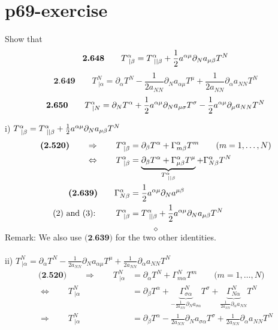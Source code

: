 \section{p69-exercise}
\begin{tcolorbox}
Show that
$$\textbf{2.648}\quad\quad T^{\alpha}_{\ |\beta} = T^{\alpha}_{\ ||\beta} + \frac{1}{2} a^{\alpha \mu} \partial_N a_{\mu\beta}T^N$$
$$\textbf{2.649}\quad\quad T^{N}_{\ |\alpha} = \partial_{\alpha}T^{N} - \frac{1}{2 a_{NN}} \partial_N a_{\alpha\mu}T^{\mu} + \frac{1}{2 a_{NN}} \partial_{\alpha} a_{NN}T^{N}$$
$$\textbf{2.650}\quad\quad T^{\alpha}_{\ |N} = \partial_{N}T^{\alpha}  + \frac{1}{2} a^{\alpha\mu} \partial_N a_{\mu\sigma}T^{\sigma} - \frac{1}{2} a^{\alpha\mu}  \partial_{\mu} a_{NN}T^{N}$$
\end{tcolorbox}
i) $T^{\alpha}_{\ |\beta} = T^{\alpha}_{\ ||\beta} + \half a^{\alpha \mu} \partial_N a_{\mu\beta}T^N$\\
\begin{align}
\textbf{(2.520)}\quad\quad \Rightarrow \quad\quad T^{\alpha}_{\ |\beta} &= \partial_{\beta}T^{\alpha}+\Gamma^{\alpha}_{m\beta}T^m \quad\quad\text{(}m = 1,\dots,N \text{)}\\
\Leftrightarrow \quad\quad T^{\alpha}_{\ |\beta} &= \underbrace{ \partial_{\beta}T^{\alpha}+ \Gamma^{\alpha}_{\mu \beta} T^{\mu}}_{T^{\alpha}_{ \ || \beta}} +\Gamma^{\alpha}_{N \beta}T^{N}\\
\textbf{(2.639)}\quad\quad \Gamma^{\alpha}_{N\beta} &= \frac{1}{2} a^{\alpha \mu}\partial_N a^{\mu \beta}\\
\text{(2) and (3): }\quad\quad T^{\alpha}_{\ |\beta} &= T^{\alpha}_{\ ||\beta} + \frac{1}{2} a^{\alpha \mu} \partial_N a_{\mu\beta}T^N
\end{align}
$$\diamond$$
Remark: We also use $\textbf{(2.639)}$ for the two other identities.\\\\
ii) $T^{N}_{\ |\alpha} = \partial_{\alpha}T^{N} - \frac{1}{2 a_{NN}} \partial_N a_{\alpha\mu}T^{\mu} + \frac{1}{2 a_{NN}} \partial_{\alpha} a_{NN}T^{N}$\\
\begin{align}
\textbf{(2.520)}\quad\quad \Rightarrow \quad\quad T^{N}_{\ |\alpha} &= \partial_{\alpha}T^{N}+\Gamma^{N}_{m\alpha}T^m \quad\quad\text{(}m = 1,\dots,N \text{)}\\
\Leftrightarrow \quad\quad T^{N}_{\ |\alpha} &=  \partial_{\beta}T^{\alpha}+ \underbrace{\Gamma^{N}_{\sigma \alpha}}_{ - \frac{1}{2a_{NN}}\partial_N a_{\sigma\alpha}} T^{\sigma } +\underbrace{\Gamma^{N}_{N \alpha}}_{ \frac{1}{2a_{NN}}\partial_{\alpha} a_{NN}}T^{N}\\
\Rightarrow \quad\quad T^{N}_{\ |\alpha} &=  \partial_{\beta}T^{\alpha} - \frac{1}{2a_{NN}}\partial_N a_{\sigma\alpha}T^{\sigma } +\frac{1}{2a_{NN}}\partial_{\alpha} a_{NN}T^{N}
\end{align}\\
